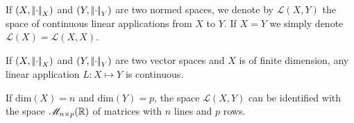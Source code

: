 \documentclass{article}
\begin{document}
\begin{definition}
	If $(X,\left|\negthinspace\left|\cdot\right|\negthinspace\right|_X)$ and $(Y,\left|\negthinspace\left|\cdot\right|\negthinspace\right|_Y)$ are two normed spaces, we denote by $\mathcal{L}(X,Y)$ the space of continuous linear applications from $X$ to $Y$. If $X=Y$ we simply denote $\mathcal{L}(X)=\mathcal{L}(X,X)$.
\end{definition}
\begin{proposition}
	If $(X,\left|\negthinspace\left|\cdot\right|\negthinspace\right|_X)$ and $(Y,\left|\negthinspace\left|\cdot\right|\negthinspace\right|_Y)$ are two vector spaces and $X$ is of finite dimension, any linear application $L:X\mapsto Y$ is continuous.
\end{proposition}
\begin{remark}
	If $\mathrm{dim}(X)=n$ and $\mathrm{dim}(Y)=p$, the space $\mathscr{L}(X,Y)$ can be identified with the space $\mathscr{M}_{n\times p}(\mathbb{R})$ of matrices with $n$ lines and $p$ rows.
\end{remark}
\end{document}
